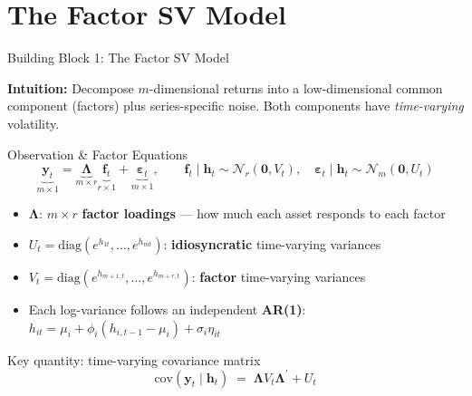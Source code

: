 \documentclass[10pt]{beamer}\usepackage[]{graphicx}\usepackage[table]{xcolor}
\begin{document}
\section{The Factor SV Model}

\begin{frame}{Building Block 1: The Factor SV Model}

  \textbf{Intuition:} Decompose $m$-dimensional returns into a
  low-dimensional common component (factors) plus series-specific noise.
  Both components have \emph{time-varying} volatility.

  \vspace{0.4em}

  \begin{alertblock}{Observation \& Factor Equations}
    \[
      \underbrace{\mathbf{y}_t}_{m \times 1}
      = \underbrace{\boldsymbol{\Lambda}}_{m \times r}
        \underbrace{\mathbf{f}_t}_{r \times 1}
      + \underbrace{\boldsymbol{\varepsilon}_t}_{m \times 1},
      \qquad
      \mathbf{f}_t \mid \mathbf{h}_t \sim \mathcal{N}_r(\mathbf{0}, V_t),
      \quad
      \boldsymbol{\varepsilon}_t \mid \mathbf{h}_t \sim \mathcal{N}_m(\mathbf{0}, U_t)
    \]
  \end{alertblock}

  \begin{itemize}
    \setlength\itemsep{0.45em}
    \item $\boldsymbol{\Lambda}$: $m \times r$ \textbf{factor loadings} ---
          how much each asset responds to each factor
    \item $U_t = \mathrm{diag}(e^{h_{1t}}, \ldots, e^{h_{mt}})$:
          \textbf{idiosyncratic} time-varying variances
    \item $V_t = \mathrm{diag}(e^{h_{m+1,t}}, \ldots, e^{h_{m+r,t}})$:
          \textbf{factor} time-varying variances
    \item Each log-variance follows an independent \textbf{AR(1)}:
          $h_{it} = \mu_i + \phi_i(h_{i,t-1}-\mu_i) + \sigma_i\eta_{it}$
  \end{itemize}

  \vspace{0.2em}

  \begin{block}{Key quantity: time-varying covariance matrix}
    \[
      \mathrm{cov}(\mathbf{y}_t \mid \mathbf{h}_t)
      \;=\; \boldsymbol{\Lambda} V_t \boldsymbol{\Lambda}^\prime + U_t
    \]
  \end{block}

\end{frame}
\end{document}
